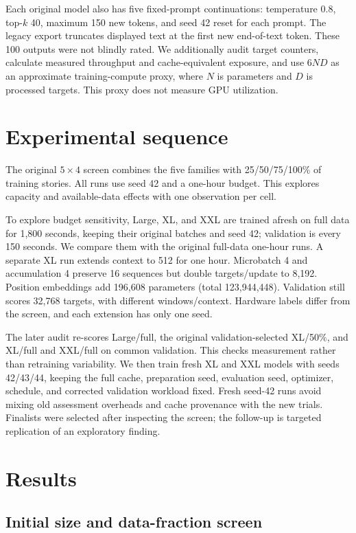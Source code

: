 \documentclass[10pt,twocolumn,letterpaper]{article}
\begin{document}
Each original model also has five fixed-prompt continuations: temperature 0.8,
top-$k$ 40, maximum 150 new tokens, and seed 42 reset for each prompt. The legacy
export truncates displayed text at the first new end-of-text token. These 100
outputs were not blindly rated. We additionally audit target counters, calculate
measured throughput and cache-equivalent exposure, and use $6ND$ as an approximate
training-compute proxy, where $N$ is parameters and $D$ is processed targets.
This proxy does not measure GPU utilization.

\section{Experimental sequence}

The original $5\times4$ screen combines the five families with 25/50/75/100\%
of training stories. All runs use seed 42 and a one-hour budget. This explores
capacity and available-data effects with one observation per cell.

To explore budget sensitivity, Large, XL, and XXL are trained afresh on full
data for 1,800 seconds, keeping their original batches and seed 42; validation
is every 150 seconds. We compare them with the original full-data one-hour
runs. A separate XL run extends context to 512 for one hour. Microbatch 4 and
accumulation 4 preserve 16 sequences but double targets/update to 8,192.
Position embeddings add 196,608 parameters (total 123,944,448). Validation still
scores 32,768 targets, with different windows/context. Hardware labels differ
from the screen, and each extension has only one seed.

The later audit re-scores Large/full, the original validation-selected XL/50\%,
and XL/full and XXL/full on common validation. This checks measurement rather
than retraining variability. We then train fresh XL and XXL models with seeds
42/43/44, keeping the full cache, preparation seed, evaluation seed, optimizer,
schedule, and corrected validation workload fixed. Fresh seed-42 runs avoid
mixing old assessment overheads and cache provenance with the new trials.
Finalists were selected after inspecting the screen; the follow-up is targeted
replication of an exploratory finding.

\section{Results}

\subsection{Initial size and data-fraction screen}
\end{document}
